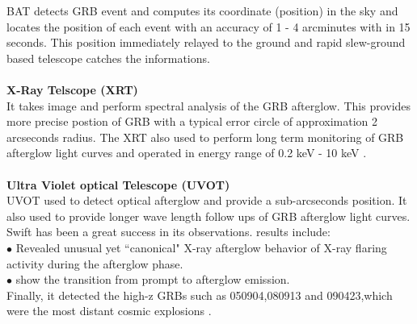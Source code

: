 BAT detects GRB event and computes its coordinate (position) in the sky and
locates the position of each event with an accuracy of 1 - 4 arcminutes with in 15
seconds. This position immediately relayed to the ground and rapid slew-ground
based telescope catches the informations.\\\\
\textbf{X-Ray Telscope (XRT)}\\
It takes image and perform spectral analysis of the GRB afterglow. This provides
more precise postion of GRB with a typical error circle of approximation 2 arcseconds
radius. The XRT also used to perform long term monitoring of GRB afterglow light
curves and operated in energy range of 0.2 keV - 10 keV .\\\\
\textbf{ Ultra Violet optical Telescope (UVOT)}\\
UVOT used to detect optical afterglow and provide a sub-arcseconds position. It
also used to provide longer wave length follow ups of GRB afterglow light curves.
 Swift has been a great success in its observations. results include:\\
$\bullet$ Revealed unusual yet “canonical" X-ray afterglow behavior of X-ray flaring activity during the afterglow phase.\\
$\bullet$ show the transition from prompt to afterglow emission.\\
Finally, it detected the high-z GRBs such as 050904,080913 and 090423,which
were the most distant cosmic explosions \citep {5} \citep{7}.\\\\
